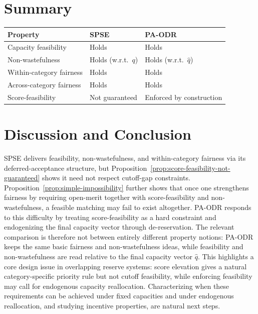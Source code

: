 \documentclass[10pt]{article}
\newcommand{\1}{\mathbf{1}}
\begin{document}


\section{Summary}

\begin{center}
\renewcommand{\arraystretch}{1.3}
\begin{tabular}{lll}
\toprule
\textbf{Property} & \textbf{SPSE} & \textbf{PA-ODR} \\
\midrule
Capacity feasibility & Holds & Holds \\
Non-wastefulness & Holds (w.r.t.\ $q$) & Holds (w.r.t.\ $\hat q$) \\
Within-category fairness & Holds & Holds \\
Across-category fairness & Holds & Holds \\
Score-feasibility & Not guaranteed & Enforced by construction \\
\bottomrule
\end{tabular}
\end{center}

\section{Discussion and Conclusion}
SPSE delivers feasibility, non-wastefulness, and within-category fairness via its deferred-acceptance structure, but Proposition~\ref{prop:score-feasibility-not-guaranteed} shows it need not respect cutoff-gap constraints. Proposition~\ref{prop:simple-impossibility} further shows that once one strengthens fairness by requiring open-merit together with score-feasibility and non-wastefulness, a feasible matching may fail to exist altogether. PA-ODR responds to this difficulty by treating score-feasibility as a hard constraint and endogenizing the final capacity vector through de-reservation. The relevant comparison is therefore not between entirely different property notions: PA-ODR keeps the same basic fairness and non-wastefulness ideas, while feasibility and non-wastefulness are read relative to the final capacity vector $\hat q$. This highlights a core design issue in overlapping reserve systems: score elevation gives a natural category-specific priority rule but not cutoff feasibility, while enforcing feasibility may call for endogenous capacity reallocation. Characterizing when these requirements can be achieved under fixed capacities and under endogenous reallocation, and studying incentive properties, are natural next steps.
\end{document}
